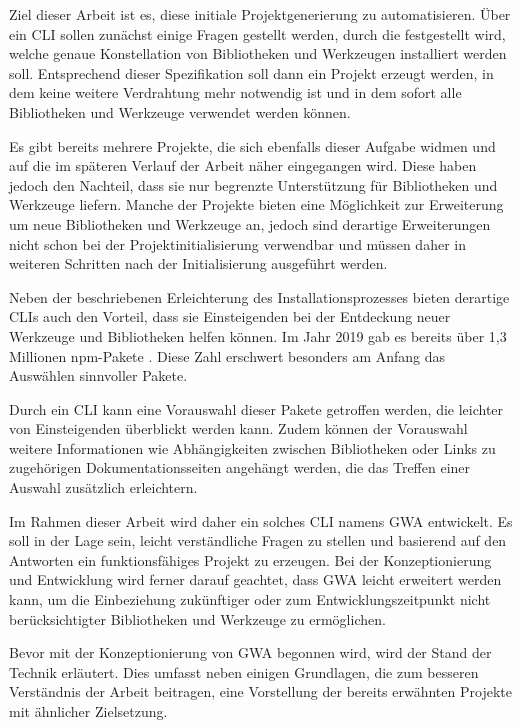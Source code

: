 Ziel dieser Arbeit ist es, diese initiale Projektgenerierung zu automatisieren. Über ein \gls{CLI} sollen zunächst einige Fragen gestellt werden, durch die festgestellt wird, welche genaue Konstellation von Bibliotheken und Werkzeugen installiert werden soll. Entsprechend dieser Spezifikation soll dann ein Projekt erzeugt werden, in dem keine weitere Verdrahtung mehr notwendig ist und in dem sofort alle Bibliotheken und Werkzeuge verwendet werden können.

Es gibt bereits mehrere Projekte, die sich ebenfalls dieser Aufgabe widmen und auf die im späteren Verlauf der Arbeit näher eingegangen wird. Diese haben jedoch den Nachteil, dass sie nur begrenzte Unterstützung für Bibliotheken und Werkzeuge liefern. Manche der Projekte bieten eine Möglichkeit zur Erweiterung um neue Bibliotheken und Werkzeuge an, jedoch sind derartige Erweiterungen nicht schon bei der Projektinitialisierung verwendbar und müssen daher in weiteren Schritten nach der Initialisierung ausgeführt werden.

Neben der beschriebenen Erleichterung des Installationsprozesses bieten derartige \gls{CLI}s auch den Vorteil, dass sie Einsteigenden bei der Entdeckung neuer Werkzeuge und Bibliotheken helfen können. Im Jahr 2019 gab es bereits über 1,3 Millionen \gls{npm}-Pakete \cite{npm_package_count}. Diese Zahl erschwert besonders am Anfang das Auswählen sinnvoller Pakete.

Durch ein \gls{CLI} kann eine Vorauswahl dieser Pakete getroffen werden, die leichter von Einsteigenden überblickt werden kann. Zudem können der Vorauswahl weitere Informationen wie Abhängigkeiten zwischen Bibliotheken oder Links zu zugehörigen Dokumentationsseiten angehängt werden, die das Treffen einer Auswahl zusätzlich erleichtern.

Im Rahmen dieser Arbeit wird daher ein solches \gls{CLI} namens \gls{GWA} entwickelt. Es soll in der Lage sein, leicht verständliche Fragen zu stellen und basierend auf den Antworten ein funktionsfähiges Projekt zu erzeugen. Bei der Konzeptionierung und Entwicklung wird ferner darauf geachtet, dass \gls{GWA} leicht erweitert werden kann, um die Einbeziehung zukünftiger oder zum Entwicklungszeitpunkt nicht berücksichtigter Bibliotheken und Werkzeuge zu ermöglichen.

Bevor mit der Konzeptionierung von \gls{GWA} begonnen wird, wird der Stand der Technik erläutert. Dies umfasst neben einigen Grundlagen, die zum besseren Verständnis der Arbeit beitragen, eine Vorstellung der bereits erwähnten Projekte mit ähnlicher Zielsetzung.

